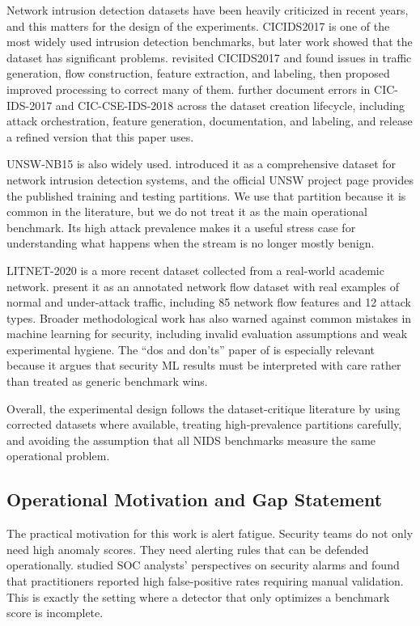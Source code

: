 \documentclass[preprint,12pt,authoryear]{elsarticle}
\begin{document}
Network intrusion detection datasets have been heavily criticized in recent years, and this matters for the design of the experiments. CICIDS2017 \citep{sharafaldin2018cicids} is one of the most widely used intrusion detection benchmarks, but later work showed that the dataset has significant problems. \citet{engelen2021troubleshooting} revisited CICIDS2017 and found issues in traffic generation, flow construction, feature extraction, and labeling, then proposed improved processing to correct many of them. \citet{liu2022errorprevalence} further document errors in CIC-IDS-2017 and CIC-CSE-IDS-2018 across the dataset creation lifecycle, including attack orchestration, feature generation, documentation, and labeling, and release a refined version that this paper uses.

UNSW-NB15 is also widely used. \citet{moustafa2015unsw} introduced it as a comprehensive dataset for network intrusion detection systems, and the official UNSW project page provides the published training and testing partitions. We use that partition because it is common in the literature, but we do not treat it as the main operational benchmark. Its high attack prevalence makes it a useful stress case for understanding what happens when the stream is no longer mostly benign.

LITNET-2020 is a more recent dataset collected from a real-world academic network. \citet{damasevicius2020litnet} present it as an annotated network flow dataset with real examples of normal and under-attack traffic, including 85 network flow features and 12 attack types. Broader methodological work has also warned against common mistakes in machine learning for security, including invalid evaluation assumptions and weak experimental hygiene. The ``dos and don'ts'' paper of \citet{arp2022dosdonts} is especially relevant because it argues that security ML results must be interpreted with care rather than treated as generic benchmark wins.

Overall, the experimental design follows the dataset-critique literature by using corrected datasets where available, treating high-prevalence partitions carefully, and avoiding the assumption that all NIDS benchmarks measure the same operational problem.

\subsection{Operational Motivation and Gap Statement}
\label{sec:bg-gap}

The practical motivation for this work is alert fatigue. Security teams do not only need high anomaly scores. They need alerting rules that can be defended operationally. \citet{alahmadi2022falsepositives} studied SOC analysts' perspectives on security alarms and found that practitioners reported high false-positive rates requiring manual validation. This is exactly the setting where a detector that only optimizes a benchmark score is incomplete.
\end{document}
